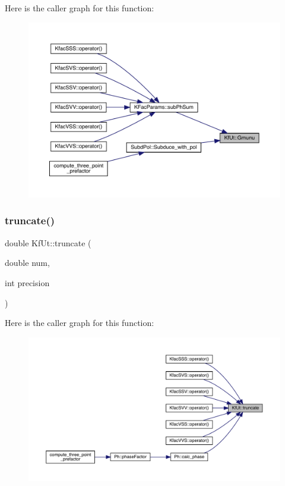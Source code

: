 Here is the caller graph for this function\+:\nopagebreak
\begin{figure}[H]
\begin{center}
\leavevmode
\includegraphics[width=350pt]{d8/da5/namespaceKfUt_ac090f8c3b57fe35c462bd3c3c2d8f08b_icgraph}
\end{center}
\end{figure}
\mbox{\label{namespaceKfUt_a155e8db38d770e216ef19d9938394c17}} 
\subsubsection{\texorpdfstring{truncate()}{truncate()}}
{\footnotesize\ttfamily double Kf\+Ut\+::truncate (\begin{DoxyParamCaption}\item[{double}]{num,  }\item[{int}]{precision }\end{DoxyParamCaption})}

Here is the caller graph for this function\+:\nopagebreak
\begin{figure}[H]
\begin{center}
\leavevmode
\includegraphics[width=350pt]{d8/da5/namespaceKfUt_a155e8db38d770e216ef19d9938394c17_icgraph}
\end{center}
\end{figure}
